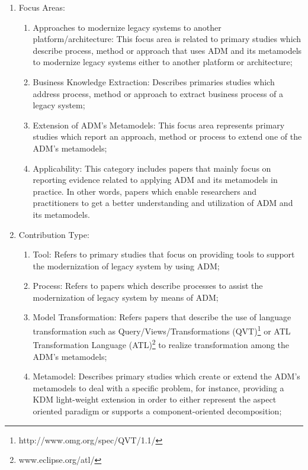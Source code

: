 \begin{enumerate}

\item Focus Areas: 

\begin{enumerate}

\item Approaches to modernize legacy systems to another platform/architecture: This focus area is related to primary studies which describe process, method or approach that uses ADM and its metamodels to modernize legacy systems either to another platform  or architecture;

\item Business Knowledge Extraction: Describes primaries studies which address process, method or approach to extract business process of a legacy system;

\item Extension of ADM's Metamodels: This focus area represents primary studies which report an approach, method or process to extend one of the ADM's metamodels;

\item Applicability: This category includes papers that mainly focus on reporting evidence related to applying ADM and its metamodels in practice. In other words, papers which enable researchers and practitioners to get a better understanding and utilization of ADM and its metamodels.

\end{enumerate}

\item Contribution Type:

\begin{enumerate}

\item Tool: Refers to primary studies that focus on providing tools to support the modernization of legacy system by using ADM; 

\item Process: Refers to papers which describe processes to assist the modernization of legacy system by means of ADM;

\item Model Transformation: Refers papers that describe the use of language transformation such as Query/Views/Transformations (QVT)\footnote{http://www.omg.org/spec/QVT/1.1/} or ATL Transformation Language (ATL)\footnote{www.eclipse.org/atl/} to realize transformation among the ADM's metamodels;

\item Metamodel: Describes primary studies which create or extend the ADM's metamodels to deal with a specific problem, for instance, providing a KDM light-weight extension in order to either represent the aspect oriented paradigm or supports a component-oriented decomposition;


\end{enumerate}
\end{enumerate}
